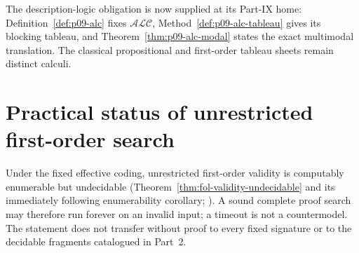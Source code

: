 The description-logic obligation is now supplied at its Part-IX home:
Definition~\ref{def:p09-alc} fixes \(\mathcal{ALC}\),
Method~\ref{def:p09-alc-tableau} gives its blocking tableau, and
Theorem~\ref{thm:p09-alc-modal} states the exact multimodal translation. The
classical propositional and first-order tableau sheets remain distinct
calculi.

\section{Practical status of unrestricted first-order search}

Under the fixed effective coding, unrestricted first-order validity is
computably enumerable but undecidable
(Theorem~\ref{thm:fol-validity-undecidable} and its immediately following
enumerability corollary;
\cite{Church1936,Turing1937}).  A sound complete proof search may therefore
run forever on an invalid input; a timeout is not a countermodel.  The statement
does not transfer without proof to every fixed signature or to the decidable
fragments catalogued in Part~2.
